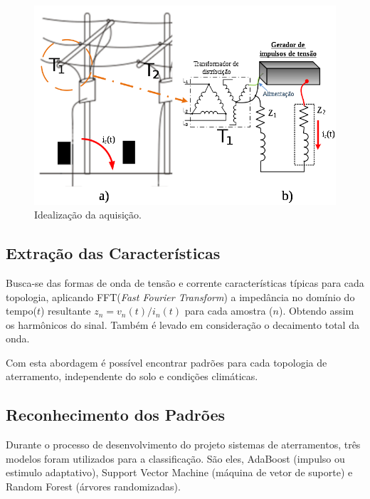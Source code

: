 \documentclass[a4paper, 10pt]{article}
\begin{document}
\begin{figure}[!h]
    \caption{\label{fig_ideia_aquisicao} Idealização da aquisição.}
	    \begin{center}
            \includegraphics[scale=0.4]{../fotos/sinal/trafo.png}
	    \end{center}
\end{figure}

\subsection{Extração das Características}

Busca-se das formas de onda de tensão e corrente características típicas para 
cada topologia, aplicando FFT(\textit{Fast Fourier Transform}) a impedância 
no domínio do tempo($t$) resultante $z_n=v_n(t)/i_n(t)$ para cada amostra ($n$).
Obtendo assim os harmônicos do sinal. Também é levado em consideração
o decaimento total da onda.


Com esta abordagem é possível encontrar padrões para cada topologia de aterramento, 
independente do solo e condições climáticas.

\subsection{Reconhecimento dos Padrões}

Durante o processo de desenvolvimento do projeto sistemas de 
aterramentos, três modelos foram utilizados para a classificação.
São eles, AdaBoost (impulso ou estimulo adaptativo), Support 
Vector Machine (máquina de vetor de suporte) e Random Forest
(árvores randomizadas). 
\end{document}
